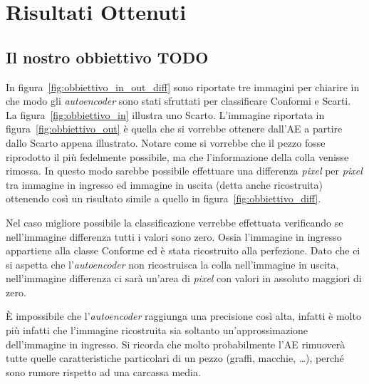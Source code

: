 
\chapter{Risultati Ottenuti}

\clearpage
\section{Il nostro obbiettivo TODO}
In figura~\ref{fig:obbiettivo_in_out_diff} sono riportate tre immagini per chiarire in che modo gli \textit{autoencoder} sono stati sfruttati per classificare Conformi e Scarti.
La figura~\ref{fig:obbiettivo_in} illustra uno Scarto.
L'immagine riportata in figura~\ref{fig:obbiettivo_out} è quella che si vorrebbe ottenere dall'AE a partire dallo Scarto appena illustrato.
Notare come si vorrebbe che il pezzo fosse riprodotto il più fedelmente possibile, ma che l'informazione della colla venisse rimossa.
In questo modo sarebbe possibile effettuare una differenza \textit{pixel} per \textit{pixel} tra immagine in ingresso ed immagine in uscita (detta anche ricostruita) ottenendo così un risultato simile a quello in figura~\ref{fig:obbiettivo_diff}.

Nel caso migliore possibile la classificazione verrebbe effettuata verificando se nell'immagine differenza tutti i valori sono zero.
Ossia l'immagine in ingresso appartiene alla classe Conforme ed è stata ricostruito alla perfezione.
Dato che ci si aspetta che l'\textit{autoencoder} non ricostruisca la colla nell'immagine in uscita, nell'immagine differenza ci sarà un'area di \textit{pixel} con valori in assoluto maggiori di zero.

È impossibile che l'\textit{autoencoder} raggiunga una precisione così alta, infatti è molto più infatti che l'immagine ricostruita sia soltanto un'approssimazione dell'immagine in ingresso.
Si ricorda che molto probabilmente l'AE rimuoverà tutte quelle caratteristiche particolari di un pezzo (graffi, macchie, \dots ), perché sono rumore rispetto ad una carcassa media.


